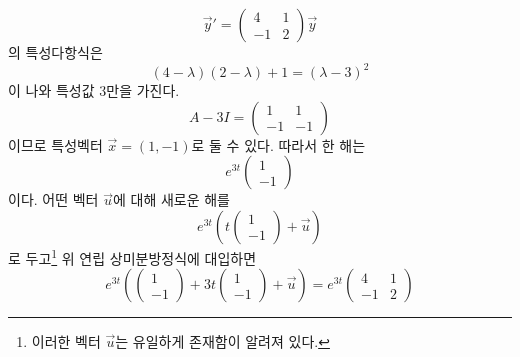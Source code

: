 \documentclass[../engineering_mathematics_lecture_note.tex]{subfiles}
\begin{document}
\begin{enumerate}
        \begin{equation*}
            \vec y' = \begin{pmatrix}
                4 & 1\\
                -1 & 2
            \end{pmatrix}
            \vec y
        \end{equation*}
        의 특성다항식은
        \begin{equation*}
            (4 - \lambda)(2 - \lambda) + 1 = (\lambda - 3)^2
        \end{equation*}
        이 나와 특성값 3만을 가진다.
        \begin{equation*}
            A - 3I = \begin{pmatrix}
                1 & 1\\
                -1 & -1
            \end{pmatrix}
        \end{equation*}
        이므로 특성벡터 $\vec x = (1, -1)$로 둘 수 있다.
        따라서 한 해는
        \begin{equation*}
            e^{3t} \begin{pmatrix}
                1 \\ -1
            \end{pmatrix}
        \end{equation*}
        이다.
        어떤 벡터 $\vec u$에 대해 새로운 해를
        \begin{equation*}
            e^{3t} \left( t \begin{pmatrix}
                1 \\ -1
        \end{pmatrix} + \vec u\right)
        \end{equation*}
        로 두고\footnote{이러한 벡터 $\vec u$는 유일하게 존재함이 알려져 있다.} 위 연립 상미분방정식에 대입하면
        \begin{equation*}
            e^{3t} \left( \begin{pmatrix}
                1 \\ -1
            \end{pmatrix} + 3t \begin{pmatrix}
                1 \\ -1
            \end{pmatrix} + \vec u \right) = e^{3t} \begin{pmatrix}
            4 & 1\\
            -1 & 2
            \end{pmatrix}

\end{equation*}
\end{enumerate}
\end{document}
